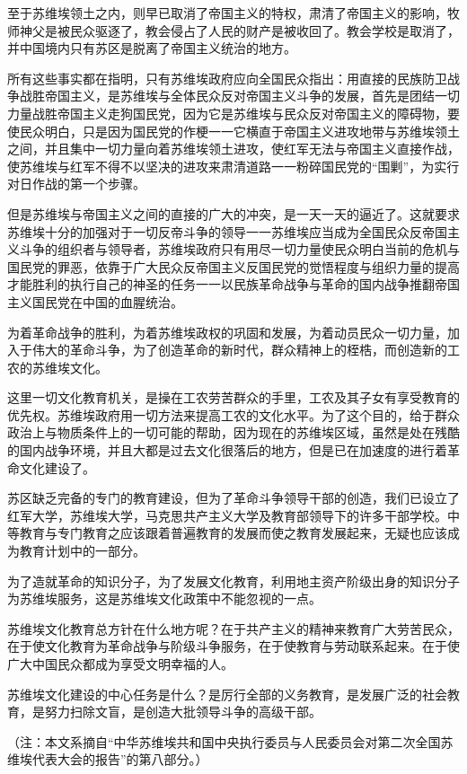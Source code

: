 至于苏维埃领土之内，则早已取消了帝国主义的特权，肃清了帝国主义的影响，牧师神父是被民众驱逐了，教会侵占了人民的财产是被收回了。教会学校是取消了，并中国境内只有苏区是脱离了帝国主义统治的地方。

所有这些事实都在指明，只有苏维埃政府应向全国民众指出：用直接的民族防卫战争战胜帝国主义，是苏维埃与全体民众反对帝国主义斗争的发展，首先是团结一切力量战胜帝国主义走狗国民党，因为它是苏维埃与民众反对帝国主义的障碍物，要使民众明白，只是因为国民党的作梗一一它横直于帝国主义进攻地带与苏维埃领土之间，并且集中一切力量向着苏维埃领土进攻，使红军无法与帝国主义直接作战，使苏维埃与红军不得不以坚决的进攻来肃清道路一一粉碎国民党的“围剿”，为实行对日作战的第一个步骤。

但是苏维埃与帝国主义之间的直接的广大的冲突，是一天一天的逼近了。这就要求苏维埃十分的加强对于一切反帝斗争的领导一一苏维埃应当成为全国民众反帝国主义斗争的组织者与领导者，苏维埃政府只有用尽一切力量使民众明白当前的危机与国民党的罪恶，依靠于广大民众反帝国主义反国民党的觉悟程度与组织力量的提高才能胜利的执行自己的神圣的任务一一以民族革命战争与革命的国内战争推翻帝国主义国民党在中国的血腥统治。

为着革命战争的胜利，为着苏维埃政权的巩固和发展，为着动员民众一切力量，加入于伟大的革命斗争，为了创造革命的新时代，群众精神上的桎梏，而创造新的工农的苏维埃文化。

这里一切文化教育机关，是操在工农劳苦群众的手里，工农及其子女有享受教育的优先权。苏维埃政府用一切方法来提高工农的文化水平。为了这个目的，给于群众政治上与物质条件上的一切可能的帮助，因为现在的苏维埃区域，虽然是处在残酷的国内战争环境，并且大都是过去文化很落后的地方，但是已在加速度的进行着革命文化建设了。

苏区缺乏完备的专门的教育建设，但为了革命斗争领导干部的创造，我们已设立了红军大学，苏维埃大学，马克思共产主义大学及教育部领导下的许多干部学校。中等教育与专门教育之应该跟着普遍教育的发展而使之教育发展起来，无疑也应该成为教育计划中的一部分。

为了造就革命的知识分子，为了发展文化教育，利用地主资产阶级出身的知识分子为苏维埃服务，这是苏维埃文化政策中不能忽视的一点。

苏维埃文化教育总方针在什么地方呢？在于共产主义的精神来教育广大劳苦民众，在于使文化教育为革命战争与阶级斗争服务，在于使教育与劳动联系起来。在于使广大中国民众都成为享受文明幸福的人。

苏维埃文化建设的中心任务是什么？是厉行全部的义务教育，是发展广泛的社会教育，是努力扫除文盲，是创造大批领导斗争的高级干部。

（注：本文系摘自“中华苏维埃共和国中央执行委员与人民委员会对第二次全国苏维埃代表大会的报告”的第八部分。）

